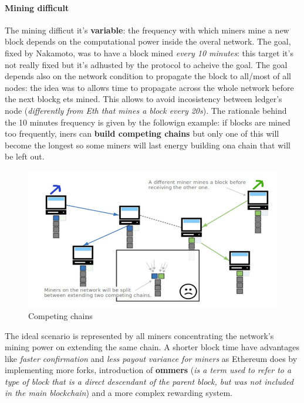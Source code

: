 \documentclass[10pt,a4paper]{report}
\begin{document}
\paragraph{Mining difficult}\label{sec:mining-difficult}
The mining difficut it's \textbf{variable}: the frequency with which miners mine a new block depends on the computational power inside the overal network. The goal, fixed by Nakamoto, was to have a block mined \textit{every 10 minutes}: this target it's not really fixed but it's adhusted by the protocol to acheive the goal.
The goal depends also on the network condition to propagate the block to all/most of all nodes: the idea was to allows time to propagate across the whole network before the next blockg ets mined.  This allows to avoid incosistency between ledger's node (\textit{differently from Eth that mines a block every 20s}).
The rationale behind the 10 minutes frequency is given by the followign example: if blocks are mined too frequently, iners can \textbf{build competing chains} but only one of this will become the longest so some miners will last energy building ona chain that will be left out.
\begin{figure}[h]
	\centering
	\includegraphics[scale=0.40]{images/Pasted image 20230405114629.png}
	\caption{Competing chains}\end{figure}

The ideal scenario is represented by all miners concentrating the network's mining power on extending the same chain.
A shorter block time have advantages like \textit{faster confirmation} and \textit{less payout variance for miners} as Ethereum does by implementing more forks, introduction of \textbf{ommers} (\textit{is a term used to refer to a type of block that is a direct descendant of the parent block, but was not included in the main blockchain}) and a more complex rewarding system.
\end{document}
